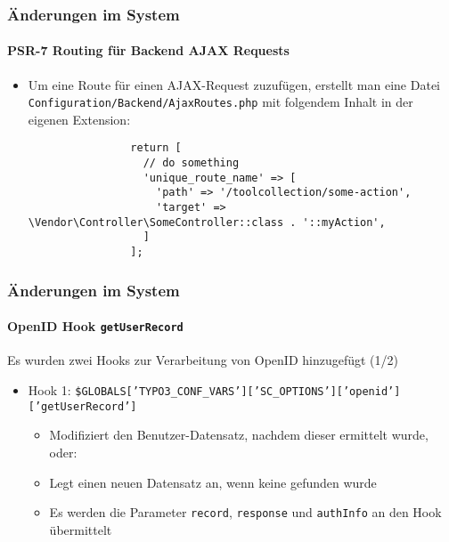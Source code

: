 \begin{frame}[fragile]
	\frametitle{Änderungen im System}
	\framesubtitle{PSR-7 Routing für Backend AJAX Requests }

	\lstset{basicstyle=\tiny\ttfamily}

	\begin{itemize}

		\item Um eine Route für einen AJAX-Request zuzufügen, erstellt man eine Datei
			\texttt{Configuration/Backend/AjaxRoutes.php} mit folgendem Inhalt in der eigenen Extension:

			\begin{lstlisting}
				return [
				  // do something
				  'unique_route_name' => [
				    'path' => '/toolcollection/some-action',
				    'target' => \Vendor\Controller\SomeController::class . '::myAction',
				  ]
				];
			\end{lstlisting}

	\end{itemize}

\end{frame}

\begin{frame}[fragile]
	\frametitle{Änderungen im System}
	\framesubtitle{OpenID Hook \texttt{getUserRecord}}

	\lstset{basicstyle=\tiny\ttfamily}

	Es wurden zwei Hooks zur Verarbeitung von OpenID hinzugefügt (1/2)

		\begin{itemize}

			\item Hook 1:\newline
				\smaller\smaller
					\texttt{\$GLOBALS['TYPO3\_CONF\_VARS']['SC\_OPTIONS']['openid']['getUserRecord']}
				\normalsize

				\begin{itemize}
					\item Modifiziert den Benutzer-Datensatz, nachdem dieser ermittelt wurde, oder:
					\item Legt einen neuen Datensatz an, wenn keine gefunden wurde
					\item Es werden die Parameter \texttt{record}, \texttt{response} und \texttt{authInfo} an den Hook übermittelt
				\end{itemize}

		\end{itemize}

\end{frame}

